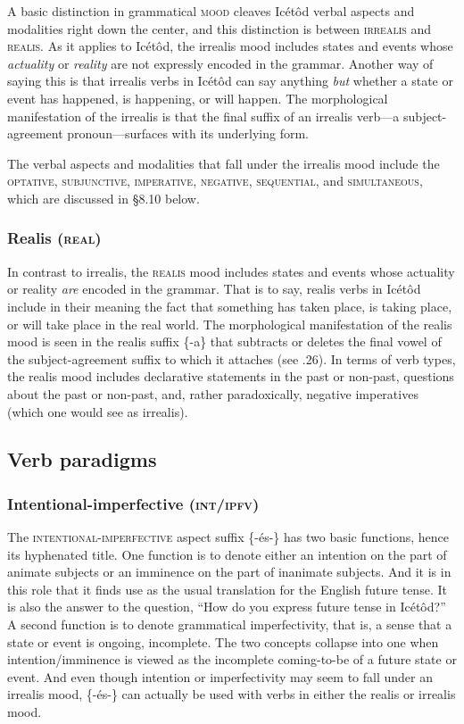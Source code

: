 \begin{table}
A basic distinction in grammatical \textsc{mood} cleaves Icétôd verbal aspects and modalities right down the center, and this distinction is between \textsc{irrealis} and \textsc{realis}. As it applies to Icétôd, the irrealis mood includes states and events whose \textit{actuality} or \textit{reality} are not expressly encoded in the grammar. Another way of saying this is that irrealis verbs in Icétôd can say anything \textit{but} whether a state or event has happened, is happening, or will happen. The morphological manifestation of the irrealis is that the final suffix of an irrealis verb—a subject-agreement pronoun—surfaces with its underlying form. 

The verbal aspects and modalities that fall under the irrealis mood include the \textsc{optative}, \textsc{subjunctive}, \textsc{imperative}, \textsc{negative}, \textsc{sequential}, and \textsc{simultaneous}, which are discussed in §8.10 below. 


\subsubsection{Realis (\textsc{real})}

In contrast to irrealis, the \textsc{realis} mood includes states and events whose actuality or reality \textit{are} encoded in the grammar. That is to say, realis verbs in Icétôd include in their meaning the fact that something has taken place, is taking place, or will take place in the real world. The morphological manifestation of the realis mood is seen in the realis suffix \{-a\} that subtracts or deletes the final vowel of the subject-agreement suffix to which it attaches (see .26). In terms of verb types, the realis mood includes declarative statements in the past or non-past, questions about the past or non-past, and, rather paradoxically, negative imperatives (which one would see as irrealis).




\subsection{Verb paradigms}
\subsubsection{Intentional-imperfective (\textsc{int/ipfv})}

The \textsc{intentional-imperfective} aspect suffix \{-és-\} has two basic functions, hence its hyphenated title. One function is to denote either an intention on the part of animate subjects or an imminence on the part of inanimate subjects. And it is in this role that it finds use as the usual translation for the English future tense. It is also the answer to the question, “How do you express future tense in Icétôd?” A second function is to denote grammatical imperfectivity, that is, a sense that a state or event is ongoing, incomplete. The two concepts collapse into one when intention/imminence is viewed as the incomplete coming-to-be of a future state or event.  And even though intention or imperfectivity may seem to fall under an irrealis mood, \{-és-\} can actually be used with verbs in either the realis or irrealis mood. 


\end{table}
